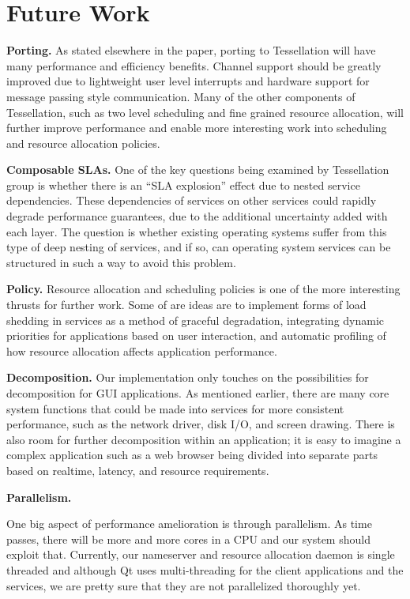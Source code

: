 \documentclass[letterpaper,twocolumn,11pt]{article}
\begin{document}
\section{Future Work}

\textbf{Porting.} As stated elsewhere in the paper, porting to Tessellation will have many performance and efficiency benefits. Channel support should be greatly improved due to lightweight user level interrupts and hardware support for message passing style communication. Many of the other components of Tessellation, such as two level scheduling and fine grained resource allocation, will further improve performance and enable more interesting work into scheduling and resource allocation policies.

\textbf{Composable SLAs.} One of the key questions being examined by Tessellation group is whether there is an ``SLA explosion'' effect due to nested service dependencies. These dependencies of services on other services could rapidly degrade performance guarantees, due to the additional uncertainty added with each layer. The question is whether existing operating systems suffer from this type of deep nesting of services, and if so, can operating system services can be structured in such a way to avoid this problem.

\textbf{Policy.} Resource allocation and scheduling policies is one of the more interesting thrusts for further work. Some of are ideas are to implement forms of load shedding in services as a method of graceful degradation, integrating dynamic priorities for applications based on user interaction, and automatic profiling of how resource allocation affects application performance.

\textbf{Decomposition.} Our implementation only touches on the possibilities for decomposition for GUI applications. As mentioned earlier, there are many core system functions that could be made into services for more consistent performance, such as the network driver, disk I/O, and screen drawing. There is also room for further decomposition within an application; it is easy to imagine a complex application such as a web browser being divided into separate parts based on realtime, latency, and resource requirements.

\textbf{Parallelism.} 

One big aspect of performance amelioration is through parallelism. As time passes, there will be more and more cores in a CPU and our system should exploit that. Currently, our nameserver and resource allocation daemon is single threaded and although Qt uses multi-threading for the client applications and the services, we are pretty sure that they are not parallelized thoroughly yet. 
\end{document}
